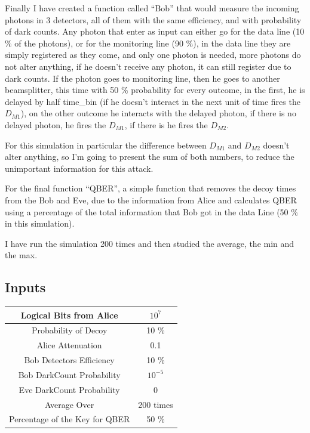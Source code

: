 \begin{refsection}
Finally I have created a function called ``Bob'' that would measure the incoming photons in 3 detectors, all of them with the same efficiency, and with probability of dark counts. Any photon that enter as input can either go for the data line (10 \% of the photons), or for the monitoring line (90 \%), in the data line they are simply registered as they come, and only one photon is needed, more photons do not alter anything, if he doesn't receive any photon, it can still register due to dark counts. If the photon goes to monitoring line, then he goes to another beamsplitter, this time with 50 \% probability for every outcome, in the first, he is delayed by half time_bin (if he doesn't interact in the next unit of time fires the $D_{M1}$), on the other outcome he interacts with the delayed photon, if there is no delayed photon, he fires the $D_{M1}$, if there is he fires the $D_{M2}$.

For this simulation in particular the difference between $D_{M1}$ and $D_{M2}$ doesn't alter anything, so I'm going to present the sum of both numbers, to reduce the unimportant information for this attack.

For the final function ``QBER'', a simple function that removes the decoy times from the Bob and Eve, due to the information from Alice and calculates QBER using a percentage of the total information that Bob got in the data Line (50 \% in this simulation).

I have run the simulation 200 times and then studied the average, the min and the max.

\subsection*{Inputs}

\begin{table}[hbt!]
\centering
\Large
\begin{tabular}{|c|c|}
\hline
\cellcolor[HTML]{005288}\color{white} Logical Bits from Alice & $10^{7}$\\ \hline
\cellcolor[HTML]{005288}\color{white} Probability of Decoy & 10 \% \\ \hline
\cellcolor[HTML]{005288}\color{white} Alice Attenuation & 0.1\\ \hline
\cellcolor[HTML]{005288}\color{white} Bob Detectors Efficiency  & 10 \% \\ \hline
\cellcolor[HTML]{005288}\color{white} Bob DarkCount Probability & $10^{-5}$ \\ \hline
\cellcolor[HTML]{005288}\color{white} Eve DarkCount Probability & $0$ \\ \hline
\cellcolor[HTML]{005288}\color{white} Average Over & 200 times\\ \hline
\cellcolor[HTML]{005288}\color{white} Percentage of the Key for QBER & 50 \% \\ \hline
\end{tabular}
\end{table}


\end{refsection}
